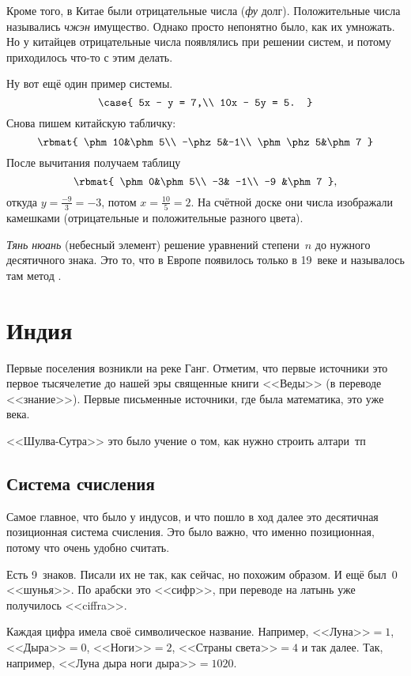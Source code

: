 \documentclass[a4paper,oneside,fleqn,10pt]{article}
\begin{document}
Кроме того, в Китае были отрицательные числа (\emph{фу} долг).
Положительные числа назывались \emph{чжэн} имущество.  Однако просто
непонятно было, как их умножать.  Но у китайцев отрицательные числа
появлялись при решении систем, и потому приходилось что-то с этим
делать.

Ну вот ещё один пример системы.
$$ \case{ 5x - y = 7,\\ 10x - 5y = 5.  }
$$ Снова пишем китайскую табличку:
$$ \rbmat{ \phm10&\phm5\\ -\phz5&-1\\ \phm\phz5&\phm7 }
$$ После вычитания получаем таблицу
$$ \rbmat{ \phm0&\phm5\\ -3& -1\\ -9 &\phm7 },
$$ откуда $y = \frac{-9}{3} = -3$, потом $x = \frac{10}{5} =2$.  На
счётной доске они числа изображали камешками (отрицательные и
положительные разного цвета).

\emph{Тянь нюань} (небесный элемент) решение уравнений степени~$n$ до
нужного десятичного знака. Это то, что в Европе появилось только в
19~веке и называлось там метод  .


\section{Индия}

Первые поселения возникли на реке Ганг. Отметим, что первые источники
это первое тысячелетие до нашей эры священные книги <<Веды>> (в
переводе <<знание>>). Первые письменные источники, где была
математика, это уже  века.

<<Шулва-Сутра>> это было учение о том, как нужно строить алтари~тп

\subsection{Система счисления}

Самое главное, что было у индусов, и что пошло в ход далее это
десятичная позиционная система счисления. Это было важно, что именно
позиционная, потому что очень удобно считать.

Есть 9~знаков. Писали их не так, как сейчас, но похожим образом.  И
ещё был~0 <<шунья>>. По арабски это <<сифр>>, при переводе на латынь
уже получилось <<ciffra>>.

Каждая цифра имела своё символическое название.  Например,
<<Луна>>$=1$, <<Дыра>>$=0$, <<Ноги>>$=2$, <<Страны света>>$=4$ и так
далее.  Так, например, <<Луна дыра ноги дыра>>$= 1020$.
\end{document}
